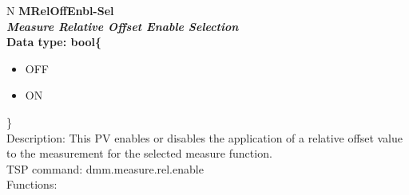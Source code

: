 \documentclass[openany]{article}
\begin{document}
		\begin{tabular}{N}
			\hline
			\bfseries MRelOffEnbl-Sel\label{pv:mreloffenbl-sel} \\ \hline
			\emph{Measure Relative Offset Enable Selection} \\
			Data type: bool\{\begin{itemize}[noitemsep]
				\small
				\item[] OFF
				\item[] ON
			\end{itemize}\} \\
			Description: This PV enables or disables the application of a relative offset value to the measurement for the selected measure function. \\
			TSP command: dmm.measure.rel.enable \\
			Functions: \\
			\arrayrulecolor{\FuncTableBorderColor}

		\end{tabular}
\end{document}
